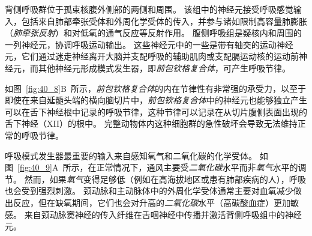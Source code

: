 背侧呼吸群位于孤束核腹外侧部的两侧和周围。
该组中的神经元接受呼吸感觉输入，包括来自肺部牵张受体和外周化学受体的传入，并参与诸如限制高容量肺膨胀（\textit{肺牵张反射}）和对低氧的通气反应等反射作用。
腹侧呼吸组是疑核内和周围的一列神经元，协调呼吸运动输出。
这些神经元中的一些是带有轴突的运动神经元，它们通过迷走神经离开大脑并支配呼吸的辅助肌肉或支配膈运动核的运动前神经元，而其他神经元形成模式发生器，即\textit{前包钦格复合体}，可产生呼吸节律。


如图~\ref{fig:40_8}B~所示，\textit{前包钦格复合体}的内在节律性有非常强的承受力，以至于即使在来自延髓头端的横向脑切片中，\textit{前包钦格复合体}中的神经元也能够独立产生可以在舌下神经根中记录的呼吸节律，这种节律可以记录在从切片腹侧表面出现的舌下神经（XII）的根中。
完整动物体内这种细胞群的急性破坏会导致无法维持正常的呼吸节律。


呼吸模式发生器最重要的输入来自感知氧气和二氧化碳的化学受体。
如图~\ref{fig:40_9}A~所示，在正常情况下，通风主要受\textit{二氧化碳}水平而非\textit{氧气}水平的调节。
然而，如果\textit{氧气}变得足够低（例如在高海拔地区或患有肺部疾病的人），呼吸也会受到强烈刺激。
颈动脉和主动脉体中的外周化学受体通常主要对血氧减少做出反应，但在缺氧期间，它们也会对升高的\textit{二氧化碳}水平（高碳酸血症）更加敏感。
来自颈动脉窦神经的传入纤维在舌咽神经中传播并激活背侧呼吸组中的神经元。


